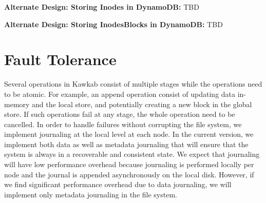 \documentclass[]{article}
\newcommand{\subtopic}[1]{\vspace{1.5pt} \noindent \textbf{#1}}
\begin{document}
%


\subtopic{Alternate Design: Storing Inodes in DynamoDB:} TBD


\subtopic{Alternate Design: Storing InodesBlocks in DynamoDB:} TBD

%

%


\section{Fault Tolerance}

Several operations in Kawkab consist of multiple stages while the operations need 
to be atomic. For example, an append operation consist of updating data in-memory and
the local store, and potentially creating a new block in the global store. If such
operations fail at any stage, the whole operation need to be cancelled. In order
to handle failures without corrupting the file system, we implement journaling
at the local level at each node. In the current version, we implement both
data as well as metadata journaling that will ensure that the system is always
in a recoverable and consistent state. We expect that journaling will have low
performance overhead because journaling is performed locally per node and the
journal is appended asynchronously on the local disk. However, if we find significant
performance overhead due to data journaling, we will implement only metadata journaling
in the file system.
\end{document}
